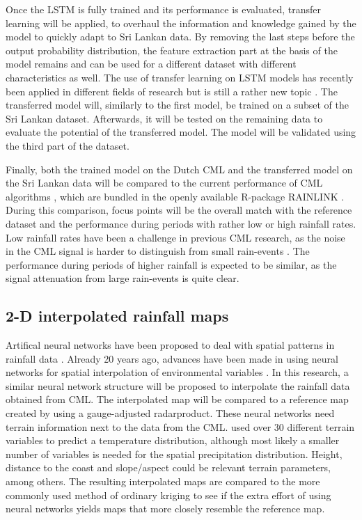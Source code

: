 \documentclass[twocolumn, 10pt, a4paper]{article}
\begin{document}
	Once the LSTM is fully trained and its performance is evaluated, transfer learning will be applied, to overhaul the information and knowledge gained by the model to quickly adapt to Sri Lankan data. By removing the last steps before the output probability distribution, the feature extraction part at the basis of the model remains and can be used for a different dataset with different characteristics as well. The use of transfer learning on LSTM models has recently been applied in different fields of research but is still a rather new topic \cite{Sagheer2021}. 
	The transferred model will, similarly to the first model, be trained on a subset of the Sri Lankan dataset. Afterwards, it will be tested on the remaining data to evaluate the potential of the transferred model. The model will be validated using the third part of the dataset. 
	
	Finally, both the trained model on the Dutch CML and the transferred model on the Sri Lankan data will be compared to the current performance of CML algorithms \cite{Overeem2011, Overeem2021}, which are bundled in the openly available R-package RAINLINK \cite{Overeem2016}. During this comparison, focus points will be the overall match with the reference dataset and the performance during periods with rather low or high rainfall rates. Low rainfall rates have been a challenge in previous CML research, as the noise in the CML signal is harder to distinguish from small rain-events \cite{Uijlenhoet2018}. The performance during periods of higher rainfall is expected to be similar, as the signal attenuation from large rain-events is quite clear. 
	
	\subsection{2-D interpolated rainfall maps}
	Artifical neural networks have been proposed to deal with spatial patterns in rainfall data \cite{Sadeghi2019}. Already 20 years ago, advances have been made in using neural networks for spatial interpolation of environmental variables \cite{Rigol2001}. In this research, a similar neural network structure will be proposed to interpolate the rainfall data obtained from CML. The interpolated map will be compared to a reference map created by using a gauge-adjusted radarproduct.
	These neural networks need terrain information next to the data from the CML.  used over 30 different terrain variables to predict a temperature distribution, although most likely a smaller number of variables is needed for the spatial precipitation distribution. Height, distance to the coast and slope/aspect could be relevant terrain parameters, among others.
	The resulting interpolated maps are compared to the more commonly used method of ordinary kriging \cite{Overeem2013} to see if the extra effort of using neural networks yields maps that more closely resemble the reference map.
	
\end{document}
